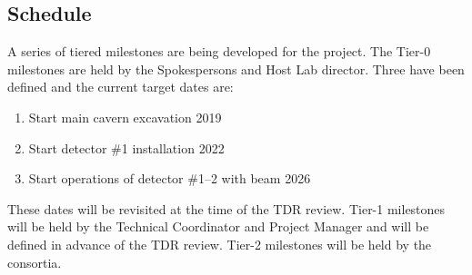 \subsection{Schedule}
\label{sec:fdsp-coord-controls}

A series of tiered milestones are being developed for the 
project. The Tier-0 milestones are held by the Spokespersons and Host
Lab director. Three have been defined and the current target dates
are:
\begin{enumerate}
\item Start main cavern excavation \hspace{2.1in} 2019
\item Start detector \#1 installation \hspace{2.1in} 2022
\item Start operations of detector \#1--2 with beam \hspace{1in} 2026
\end{enumerate}
These dates will be revisited at the time of the TDR review.  Tier-1
milestones will be held by the Technical Coordinator and  Project
Manager and will be defined in advance of the TDR review. Tier-2
milestones will be held by the consortia.

